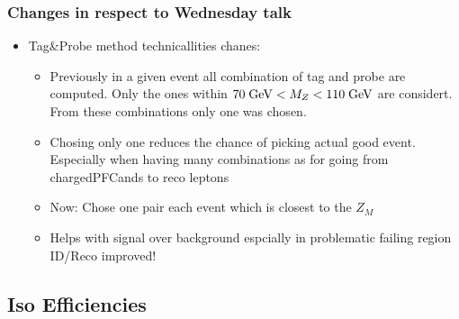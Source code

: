 \documentclass{beamer}
\begin{document}
\begin{frame}
 \frametitle{Changes in respect to Wednesday talk}
 \begin{itemize}
  \item Tag\&Probe method technicallities chanes:
  \begin{itemize}
   \item Previously in a given event all combination of tag and probe are computed. Only the ones within $70\;\text{Ge}\kern-0.06667em\text{V}<M_{Z}<110\;\text{Ge}\kern-0.06667em\text{V}$ are considert. From these combinations only one was chosen.
   \item Chosing only one reduces the chance of picking actual good event. Especially when having many combinations as for going from chargedPFCands to reco leptons
   \item Now: Chose one pair each event which is closest to the $Z_{M}$
   \item Helps with signal over background espcially in problematic failing region ID/Reco improved!
  \end{itemize}

 \end{itemize}

\end{frame}


\subsection{Iso Efficiencies}
\end{document}
